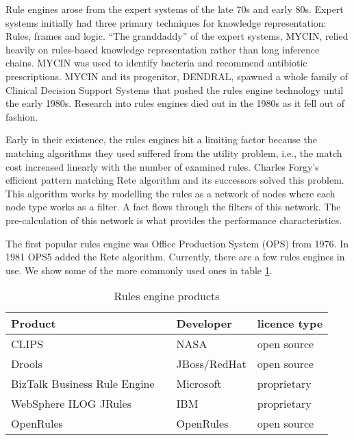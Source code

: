 Rule engines arose from the expert systems of the late 70s and early 80s.
Expert systems initially had three primary techniques for knowledge representation: Rules, frames and logic\cite{jackson1986introduction}.
``The granddaddy'' of the expert systems, MYCIN, relied heavily on rules-based knowledge representation\cite{shortliffe1974mycin} rather than long inference chains.
MYCIN was used to identify bacteria and recommend antibiotic prescriptions.
MYCIN and its progenitor, DENDRAL, spawned a whole family of Clinical Decision Support Systems that pushed the rules engine technology until the early 1980s.
Research into rules engines died out in the 1980s as it fell out of fashion.

Early in their existence, the rules engines hit a limiting factor because the matching algorithms they used suffered from the utility problem, i.e., the match cost increased linearly with the number of examined rules.
Charles Forgy's efficient pattern matching Rete algorithm\cite{forgy1989rete} and its successors solved this problem.
This algorithm works by modelling the rules as a network of nodes where each node type works as a filter.
A fact flows through the filters of this network.
The pre-calculation of this network is what provides the performance characteristics.

The first popular rules engine was Office Production System (OPS) from 1976.
In 1981 OPS5 added the Rete algorithm.
Currently, there are a few rules engines in use.
We show some of the more commonly used ones in table \ref{table:RuleEngines}.

\begin{table}
    \begin{center}
        \begin{tabular}{ |l c |l|l| } 
            \hline
            Product                      &                             & Developer    & licence type   \\
            \hline
            CLIPS                        &\cite{CLIPSProductPage}      & NASA         & open source    \\ 
            Drools                       &\cite{DroolsProductPage}     & JBoss/RedHat & open source    \\ 
            BizTalk Business Rule Engine &\cite{BiztalkProductPage}    & Microsoft    & proprietary    \\ 
            WebSphere ILOG JRules        &\cite{JRulesProductPage}     & IBM          & proprietary    \\ 
            OpenRules                    &\cite{OpenRulesProductPage}  & OpenRules    & open source    \\ 
            \hline
        \end{tabular}
    \end{center}
    \caption{Rules engine products}
    \label{table:RuleEngines}
\end{table}



